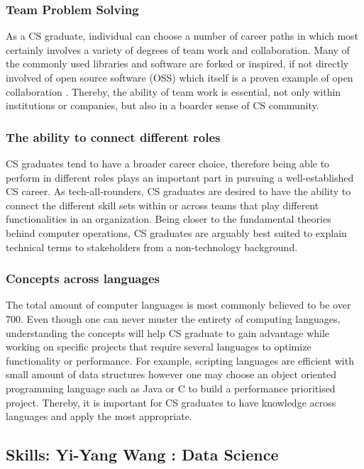\documentclass[a4paper, 11pt]{report}
\begin{document}
\subsubsection{Team Problem Solving}
As a CS graduate, individual can choose a number of career paths in which most certainly involves a variety of degrees of team work and collaboration. Many of the commonly used libraries and software are forked or inspired, if not directly involved of open source software (OSS) which itself is a proven example of open collaboration \cite{levine2014open}. Thereby, the ability of team work is essential, not only within institutions or companies, but also in a boarder sense of CS community.
\subsubsection{The ability to connect different roles}
CS graduates tend to have a broader career choice, therefore being able to perform in different roles plays an important part in pursuing a well-established CS career. As tech-all-rounders, CS graduates are desired to have the ability to connect the different skill sets within or across teams that play different functionalities in an organization. Being closer to the fundamental theories behind computer operations, CS graduates are arguably best suited to explain technical terms to stakeholders from a non-technology background.
\subsubsection{Concepts across languages}
The total amount of computer languages is most commonly believed to be over 700. Even though one can never muster the entirety of computing languages, understanding the concepts will help CS graduate to gain advantage while working on specific projects that require several languages to optimize functionality or performance. For example, scripting languages are efficient with small amount of data structures however one may choose an object oriented programming language such as Java or C to build a performance prioritised project. Thereby, it is important for CS graduates to have knowledge across languages and apply the most appropriate.

\subsection{Skills: Yi-Yang Wang : Data Science}
\end{document}
